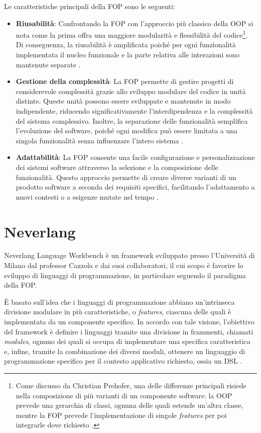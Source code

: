 \documentclass[12pt,a4paper,openright,twoside]{book}
\begin{document}
Le caratteristiche principali della \ac{FOP} sono le seguenti:
\begin{itemize}
    \item \textbf{Riusabilità}: Confrontando la \ac{FOP} con l’approccio più classico della \ac{OOP} si nota come la prima offra una maggiore 
    modularità e flessibilità del codice\footnote{Come discusso da Christian Prehofer, una delle differenze principali risiede nella composizione 
    di più varianti di un componente software: la OOP prevede una gerarchia di classi, ognuna delle quali estende un’altra classe, mentre la FOP
    prevede l’implementazione di singole \textit{features} per poi integrarle dove richiesto \cite[pp. 466-468]{Prehofer1997}.}. Di conseguenza, 
    la riusabilità è amplificata poiché per ogni funzionalità implementata il nucleo funzionale e la parte relativa alle interazioni sono mantenute separate \cite{Prehofer1997}.
    \item \textbf{Gestione della complessità}: La \ac{FOP} permette di gestire progetti di considerevole complessità grazie allo sviluppo 
    modulare del codice in unità distinte. Queste unità possono essere sviluppate e mantenute in modo indipendente, riducendo significativamente 
    l’interdipendenza e la complessità del sistema complessivo. Inoltre, la separazione delle funzionalità semplifica l’evoluzione del software, 
    poiché ogni modifica può essere limitata a una singola funzionalità senza influenzare l’intero sistema \cite{Prehofer1997}.
    \item \textbf{Adattabilità}: La \ac{FOP} consente una facile configurazione e personalizzazione dei sistemi software attraverso la selezione 
    e la composizione delle funzionalità. Questo approccio permette di creare diverse varianti di un prodotto software a seconda dei requisiti 
    specifici, facilitando l’adattamento a nuovi contesti o a esigenze mutate nel tempo \cite{Apel2013}.
\end{itemize}

\section{Neverlang}
Neverlang Language Workbench è un framework sviluppato presso l’Università di Milano dal professor Cazzola e dai suoi collaboratori, il cui scopo 
è favorire lo sviluppo di linguaggi di programmazione, in particolare seguendo il paradigma della \ac{FOP}.

È basato sull’idea che i linguaggi di programmazione abbiano un’intrinseca divisione modulare in più caratteristiche, o \textit{features}, ciascuna 
delle quali è implementata da un componente specifico. In accordo con tale visione, l’obiettivo del framework è definire i linguaggi tramite una 
divisione in frammenti, chiamati \textit{modules}, ognuno dei quali si occupa di implementare una specifica caratteristica e, infine, tramite la combinazione 
dei diversi moduli, ottenere un linguaggio di programmazione specifico per il contesto applicativo richiesto, ossia un \ac{DSL} 
\cite{NeverlangWebsite}.
\end{document}

